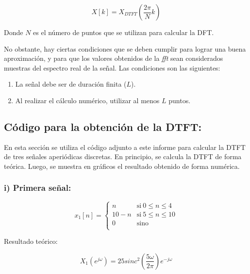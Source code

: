 \documentclass[11pt,a4paper]{article}
\begin{document}
        \begin{equation}
            X[k]=X_{DTFT}\left(  \frac{2 \pi}{N} k \right)
        \end{equation}

        Donde $N$ es el número de puntos que se utilizan para calcular la DFT.

        No obstante, hay ciertas condiciones que se deben cumplir para lograr una buena aproximación, y para que los valores obtenidos de la \textit{fft} sean considerados muestras del espectro real de la señal. Las condiciones son las siguientes:

        \begin{enumerate}
            \item La señal debe ser de duración finita ($L$).
            \item Al realizar el cálculo numérico, utilizar al menos $L$ puntos.
        \end{enumerate}
    
    \subsection{Código para la obtención de la DTFT:}
    En esta sección se utiliza el código adjunto a este informe para calcular la DTFT de tres señales aperiódicas discretas. En principio, se calcula la DTFT de forma teórica. Luego, se muestra en gráficos el resultado obtenido de forma numérica.
    

    \subsubsection*{i) Primera señal:}

    \begin{equation}
    x_{1}[n] = \left\{ 
        \begin{array}{ll} 
        n & \mathrm{si\ } 0\leq n \leq 4 \\
        10-n & \mathrm{si\ } 5\leq n \leq 10 \\
        0 & \mathrm{sino\ } \\
        \end{array} 
        \right.
    \end{equation}
    
    
    Resultado teórico:
    
    
    \begin{equation}
    X_{1}(e^{j \omega})=25 sinc^{2}\left(\frac{5 \omega}{2 \pi}\right) e^{- j \omega} 
    \end{equation}
\end{document}
